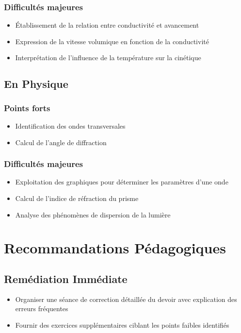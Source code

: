 \documentclass[12pt]{article}
\begin{document}
\subsubsection{Difficultés majeures}
\begin{itemize}
\item Établissement de la relation entre conductivité et avancement
\item Expression de la vitesse volumique en fonction de la conductivité
\item Interprétation de l'influence de la température sur la cinétique
\end{itemize}

\subsection{En Physique}

\subsubsection{Points forts}
\begin{itemize}
\item Identification des ondes transversales
\item Calcul de l'angle de diffraction
\end{itemize}

\subsubsection{Difficultés majeures}
\begin{itemize}
\item Exploitation des graphiques pour déterminer les paramètres d'une onde
\item Calcul de l'indice de réfraction du prisme
\item Analyse des phénomènes de dispersion de la lumière
\end{itemize}

\section{Recommandations Pédagogiques}

\subsection{Remédiation Immédiate}
\begin{itemize}
\item Organiser une séance de correction détaillée du devoir avec explication des erreurs fréquentes
\item Fournir des exercices supplémentaires ciblant les points faibles identifiés
\end{itemize}
\end{document}
